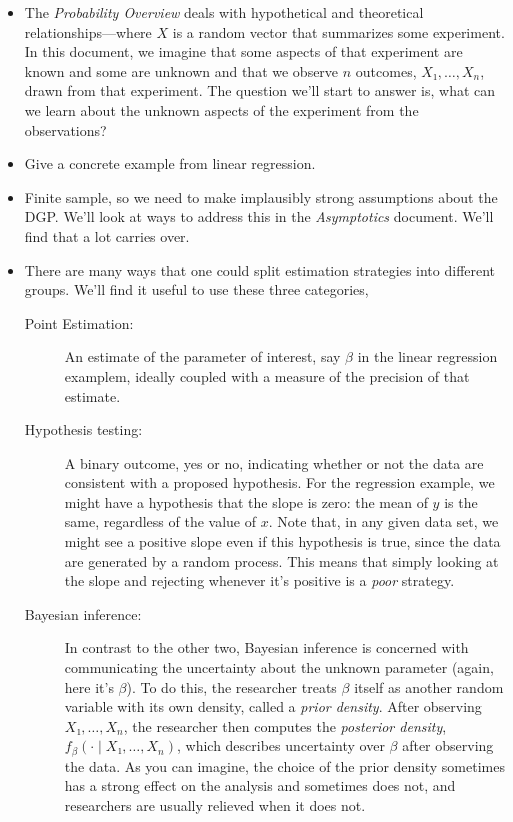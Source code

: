 \begin{itemize}

\item The \emph{Probability Overview} deals with hypothetical and
  theoretical relationships—where $X$ is a random vector that
  summarizes some experiment.  In this document, we imagine that some
  aspects of that experiment are known and some are unknown and that
  we observe $n$ outcomes, $X₁,…,X_n$, drawn from that experiment.
  The question we'll start to answer is, what can we learn about the
  unknown aspects of the experiment from the observations?

\item Give a concrete example from linear regression.

\item Finite sample, so we need to make implausibly strong assumptions
  about the DGP.  We'll look at ways to address this in the
  \emph{Asymptotics} document.  We'll find that a lot carries over.

\item There are many ways that one could split estimation strategies
  into different groups.  We'll find it useful to use these three
  categories,
  \begin{description}
  \item[Point Estimation:] An estimate of the parameter of interest,
    say $β$ in the linear regression examplem, ideally coupled with a
    measure of the precision of that estimate.

  \item[Hypothesis testing:] A binary outcome, yes or no, indicating
    whether or not the data are consistent with a proposed
    hypothesis.  For the regression example, we might have a
    hypothesis that the slope is zero: the mean of $y$ is the same,
    regardless of the value of $x$.  Note that, in any given data set,
    we might see a positive slope even if this hypothesis is true,
    since the data are generated by a random process.  This means that
    simply looking at the slope and rejecting whenever it's positive
    is a \emph{poor} strategy.

  \item[Bayesian inference:] In contrast to the other two, Bayesian
    inference is concerned with communicating the uncertainty about
    the unknown parameter (again, here it's $β$).  To do this, the
    researcher treats $β$ itself as another random variable with its
    own density, called a \emph{prior density}.  After observing
    $X₁,…,X_n$, the researcher then computes the \emph{posterior
      density}, $f_β(· ∣ X₁,…,X_n)$, which describes uncertainty over
    $β$ after observing the data.  As you can imagine, the choice of
    the prior density sometimes has a strong effect on the analysis
    and sometimes does not, and researchers are usually relieved when
    it does not.


\end{description}
\end{itemize}
